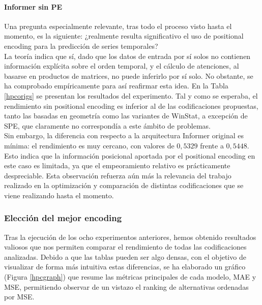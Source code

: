 \paragraph{Informer sin PE}

Una pregunta especialmente relevante, tras todo el proceso visto hasta el momento, es la siguiente: ¿realmente resulta significativo el uso de positional encoding para la predicción de series temporales?\\

La teoría indica que sí, dado que los datos de entrada por sí solos no contienen información explícita sobre el orden temporal, y el cálculo de atenciones, al basarse en productos de matrices, no puede inferirlo por sí solo.  No obstante, se ha comprobado empíricamente para así reafirmar esta idea. En la Tabla \ref{hpcorigs} se presentan los resultados del experimento. Tal y como se esperaba, el rendimiento sin positional encoding es inferior al de las codificaciones propuestas, tanto las basadas en geometría como las variantes de WinStat, a excepción de SPE, que claramente no correspondía a este ámbito de problemas.\\

Sin embargo, la diferencia con respecto a la arquitectura Informer original es mínima: el rendimiento es muy cercano, con valores de $0,5329$ frente a $0,5448$. Esto indica que la información posicional aportada por el positional encoding en este caso es limitada, ya que el empeoramiento relativo es prácticamente despreciable. Esta observación refuerza aún más la relevancia del trabajo realizado en la optimización y comparación de distintas codificaciones que se viene realizando hasta el momento.

\subsubsection{Elección del mejor encoding}

Tras la ejecución de los ocho experimentos anteriores, hemos obtenido resultados valiosos que nos permiten comparar el rendimiento de todas las codificaciones analizadas. Debido a que las tablas pueden ser algo densas, con el objetivo de visualizar de forma más intuitiva estas diferencias, se ha elaborado un gráfico (Figura \ref{hpcgraph}) que resume las métricas principales de cada modelo, MAE y MSE, permitiendo observar de un vistazo el ranking de alternativas ordenadas por MSE.\\

